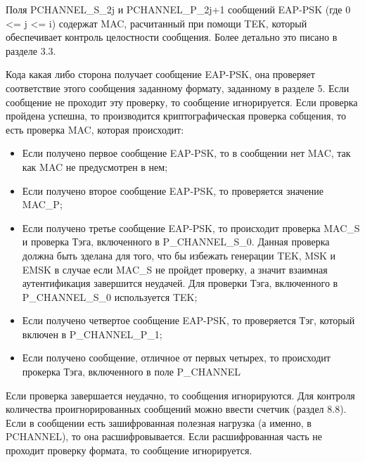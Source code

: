 Поля PCHANNEL\_S\_2j и PCHANNEL\_P\_2j+1 сообщений EAP-PSK (где 0 <= j <= i) содержат MAC, расчитанный при помощи TEK, который обеспечивает контроль целостности сообщения. Более детально это писано в разделе 3.3.

Кода какая либо сторона получает сообщение EAP-PSK, она проверяет соответствие этого сообщения заданному формату, заданному в разделе 5. Если сообщение не проходит эту проверку, то сообщение игнорируется. Если проверка пройдена успешна, то производится криптографическая проверка собщения, то есть проверка MAC, которая происходит:

\begin{itemize}
\item Если получено первое сообщение EAP-PSK, то в сообщении нет MAC, так как MAC не предусмотрен в нем;
\item Если получено второе сообщение EAP-PSK, то проверяется значение MAC\_P;
\item Если получено третье сообщение EAP-PSK, то происходит проверка MAC\_S и проверка Тэга, включенного в P\_CHANNEL\_S\_0. Данная проверка должна быть зделана для того, что бы избежать генерации TEK, MSK и EMSK в случае если MAC\_S не пройдет проверку, а значит взаимная аутентификация завершится неудачей. Для проверки Тэга, включенного в P\_CHANNEL\_S\_0 используется TEK;
\item Если получено четвертое сообщение EAP-PSK, то проверяется Тэг, который включен в P\_CHANNEL\_P\_1;
\item Если получено сообщение, отличное от первых четырех, то происходит прокерка Тэга, включенного в поле P\_CHANNEL
\end{itemize}

Если проверка завершается неудачно, то сообщения игнорируются. Для контроля количества проигнорированных сообщений можно ввести счетчик (раздел 8.8). Если в сообщении есть зашифрованная полезная нагрузка (а именно, в PCHANNEL), то она расшифровывается. Если расшифрованная часть не проходит проверку формата, то сообщение игнорируется.
